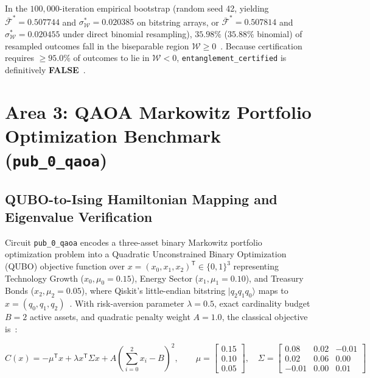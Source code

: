 \documentclass[10pt,letterpaper]{article}
\begin{document}
In the $100{,}000$-iteration empirical bootstrap (random seed 42, yielding $\bar{\mathcal{F}}^{*} = 0.507744$ and $\sigma_{\mathcal{W}}^{*} = 0.020385$ on bitstring arrays, or $\bar{\mathcal{F}}^{*} = 0.507814$ and $\sigma_{\mathcal{W}}^{*} = 0.020455$ under direct binomial resampling), $35.98\%$ ($35.88\%$ binomial) of resampled outcomes fall in the biseparable region $\mathcal{W} \ge 0$~\cite{qfx_doc}. Because certification requires $\ge 95.0\%$ of outcomes to lie in $\mathcal{W} < 0$, \texttt{entanglement\_certified} is definitively \textbf{FALSE}~\cite{qfx_doc}.

\section{Area 3: QAOA Markowitz Portfolio Optimization Benchmark (\texttt{pub\_0\_qaoa})}

\subsection{QUBO-to-Ising Hamiltonian Mapping and Eigenvalue Verification}

Circuit \texttt{pub\_0\_qaoa} encodes a three-asset binary Markowitz portfolio optimization problem into a Quadratic Unconstrained Binary Optimization (QUBO) objective function over $x = (x_0, x_1, x_2)^{\mathsf{T}} \in \{0,1\}^3$ representing Technology Growth ($x_0, \mu_0 = 0.15$), Energy Sector ($x_1, \mu_1 = 0.10$), and Treasury Bonds ($x_2, \mu_2 = 0.05$), where Qiskit's little-endian bitstring $\vert q_2 q_1 q_0 \rangle$ maps to $x = (q_0, q_1, q_2)$~\cite{qfx_doc}. With risk-aversion parameter $\lambda = 0.5$, exact cardinality budget $B = 2$ active assets, and quadratic penalty weight $A = 1.0$, the classical objective is~\cite{qfx_doc}:

\begin{equation}
C(x) = -\mu^{\mathsf{T}} x + \lambda x^{\mathsf{T}} \Sigma x + A\left(\sum_{i=0}^{2} x_i - B\right)^2, \qquad
\mu = \begin{bmatrix} 0.15 \\ 0.10 \\ 0.05 \end{bmatrix}, \quad
\Sigma = \begin{bmatrix} 0.08 & 0.02 & -0.01 \\ 0.02 & 0.06 & 0.00 \\ -0.01 & 0.00 & 0.01 \end{bmatrix}
\end{equation}
\end{document}
